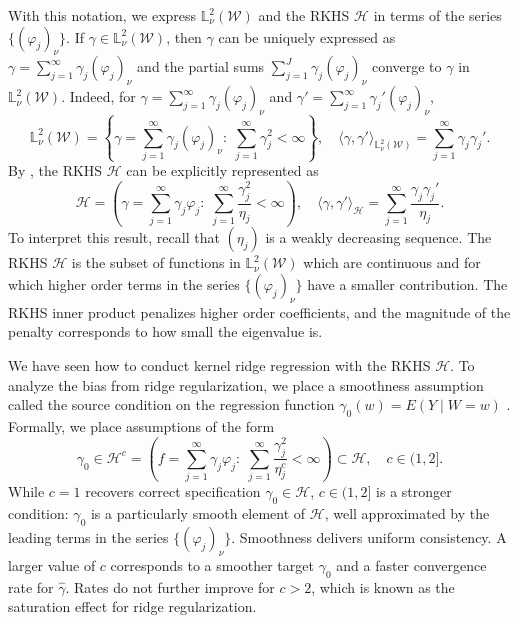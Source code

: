 With this notation, we express $\mathbb{L}_{\nu}^2(\mathcal{W})$ and the RKHS $\mathcal{H}$ in terms of the series $\{(\varphi_j)_{\nu}\}$. If $\gamma\in \mathbb{L}_{\nu}^2(\mathcal{W})$, then $\gamma$ can be uniquely expressed as
$
\gamma=\sum_{j=1}^{\infty}\gamma_j(\varphi_j)_{\nu}
$
and the partial sums $\sum_{j=1}^J \gamma_j (\varphi_j)_{\nu}$ converge to $\gamma$ in $\mathbb{L}^2_{\nu}(\mathcal{W})$. Indeed, for $\gamma=\sum_{j=1}^{\infty}\gamma_j(\varphi_j)_{\nu}$ and $\gamma'=\sum_{j=1}^{\infty}\gamma_j'(\varphi_j)_{\nu}$,
$$
 \mathbb{L}^2_{\nu}(\mathcal{W})=\left\{\gamma=\sum_{j=1}^{\infty}\gamma_j(\varphi_j)_{\nu}:\; \sum_{j=1}^{\infty}\gamma_j^2<\infty\right\},\quad \langle \gamma,\gamma' \rangle_{\mathbb{L}^2_{\nu}(\mathcal{W})}=\sum_{j=1}^{\infty} \gamma_j\gamma_j'.
$$
By \cite[Theorem 4]{cucker2002mathematical}, the RKHS $\mathcal{H}$ can be explicitly represented as
$$
\mathcal{H}=\left(\gamma=\sum_{j=1}^{\infty}\gamma_j\varphi_j:\;\sum_{j=1}^{\infty} \frac{\gamma_j^2}{\eta_j}<\infty\right),\quad \langle \gamma,\gamma' \rangle_{\mathcal{H}}=\sum_{j=1}^{\infty} \frac{\gamma_j\gamma_j'}{\eta_j}.
$$
To interpret this result, recall that $(\eta_j)$ is a weakly decreasing sequence. The RKHS $\mathcal{H}$ is the subset of functions in $\mathbb{L}^2_{\nu}(\mathcal{W})$ which are continuous and for which higher order terms in the series $\{(\varphi_j)_{\nu}\}$ have a smaller contribution. The RKHS inner product penalizes higher order coefficients, and the magnitude of the penalty corresponds to how small the eigenvalue is.

We have seen how to conduct kernel ridge regression with the RKHS $\mathcal{H}$. To analyze the bias from ridge regularization, we place a smoothness assumption called the source condition on the regression function $\gamma_0(w)=E(Y \mid W=w)$ \cite{smale2007learning,caponnetto2007optimal,carrasco2007linear}. 
% 
Formally, we place assumptions of the form
\begin{equation}\label{eq:prior}
    \gamma_0\in \mathcal{H}^c=\left(f=\sum_{j=1}^{\infty}\gamma_j\varphi_j:\;\sum_{j=1}^{\infty} \frac{\gamma_j^2}{\eta^c_j}<\infty\right)\subset \mathcal{H},\quad c\in(1,2].
\end{equation}
While $c=1$ recovers correct specification $\gamma_0\in \mathcal{H}$, $c\in(1,2]$ is a stronger condition: $\gamma_0$ is a particularly smooth element of $\mathcal{H}$, well approximated by the leading terms in the series $\{(\varphi_j)_{\nu}\}$. Smoothness delivers uniform consistency. A larger value of $c$ corresponds to a smoother target $\gamma_0$ and a faster convergence rate for $\hat{\gamma}$. Rates do not further improve for $c>2$, which is known as the saturation effect for ridge regularization. %

